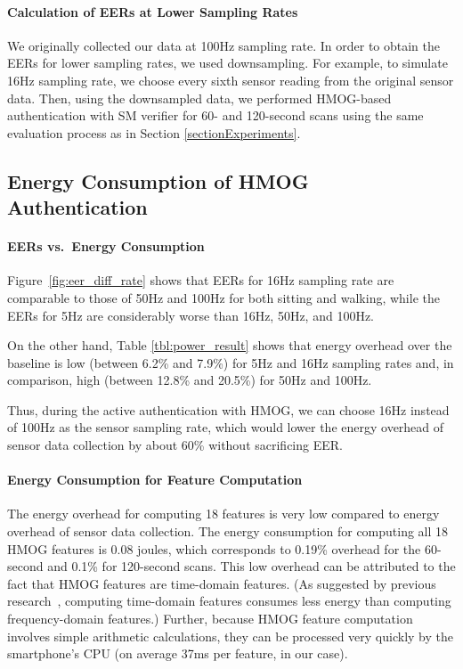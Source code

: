 \paragraph{Calculation of EERs at Lower Sampling Rates} We originally collected our data at 100Hz sampling rate. In order to obtain the EERs for lower sampling rates, we used downsampling. For example, to simulate 16Hz sampling rate, we choose every sixth sensor reading from the original sensor data. Then, using the downsampled data, we performed HMOG-based authentication with SM verifier for 60- and 120-second scans using the same evaluation process as in Section  \ref{sectionExperiments}. 

\subsection{Energy Consumption of HMOG Authentication}
\label{sec:pr}

%

\paragraph{EERs vs.~Energy Consumption} 
Figure~\ref{fig:eer_diff_rate} shows that  EERs for 16Hz 
sampling rate are comparable to those of 50Hz and 100Hz for both sitting and walking, while the EERs for 5Hz are 
considerably worse than 16Hz, 50Hz, and 100Hz. 

On the other hand, Table \ref{tbl:power_result} shows that energy overhead over the baseline is low (between 
6.2\% and 7.9\%) for 5Hz and
16Hz sampling rates and, in comparison, high (between 12.8\% and 20.5\%) for 50Hz 
and 100Hz. 
%
%
%

%
%
Thus, during the active authentication with HMOG, we can choose 16Hz instead of 
100Hz as the sensor sampling rate, which would lower the energy overhead of 
sensor data collection by about 60\% without sacrificing EER. 

%
%
\paragraph{Energy Consumption for Feature Computation} 
%
The energy overhead for computing 18 
features is very low compared to energy overhead of sensor data collection. The  
energy consumption for computing all 18 HMOG features is 0.08 joules, 
which corresponds to  0.19\% overhead for the 60-second and  0.1\% for  
120-second scans. This low overhead can be attributed to the fact that HMOG features are time-domain 
features. (As suggested by previous 
research~\cite{Krause:2005:TOP:1104998.1105279,Yan:2012:ECA:2357489.2358011}, 
computing time-domain features consumes less energy than computing frequency-domain features.)
Further, because HMOG feature computation involves simple arithmetic calculations, 
they can be processed very quickly by the smartphone's CPU (on average 37ms per feature,  in our case). %


